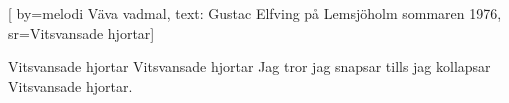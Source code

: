 [
	by={melodi Väva vadmal, text: Gustac Elfving på Lemsjöholm sommaren 1976},					
	sr={Vitsvansade hjortar}]					
	
\beginverse*
Vitsvansade hjortar
Vitsvansade hjortar
Jag tror jag snapsar 
tills jag kollapsar
Vitsvansade hjortar.
\endverse									
\endsong							
